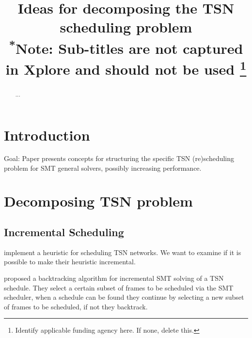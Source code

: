 \documentclass[conference]{IEEEtran}
\begin{document}
\title{Ideas for decomposing the TSN scheduling problem\\
{\footnotesize \textsuperscript{*}Note: Sub-titles are not captured in Xplore and
should not be used}
\thanks{Identify applicable funding agency here. If none, delete this.}
}

\author{
\and
{}
}

\maketitle

\begin{abstract}
...
\end{abstract}

\begin{IEEEkeywords}

\end{IEEEkeywords}

\section{Introduction}
Goal: Paper presents concepts for structuring the specific TSN (re)scheduling problem for SMT general solvers, possibly increasing performance.

\section{Decomposing TSN problem}
\subsection{Incremental Scheduling}
\cite{vlk_large-scale_2022} implement a heuristic for scheduling TSN networks. We want to examine if it is possible to make their heuristic incremental.

\cite{steiner_evaluation_2010} proposed a backtracking algorithm for incremental SMT solving of a TSN schedule. They select a certain subset of frames to be scheduled via the SMT scheduler, when a schedule can be found they continue by selecting a new subset of frames to be scheduled, if not they backtrack.
\end{document}

